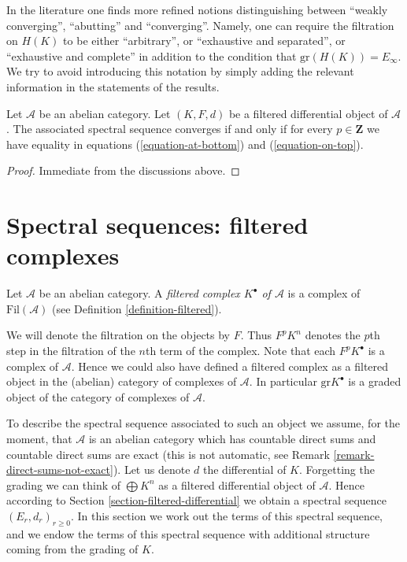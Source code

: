 \noindent
In the literature one finds more refined notions distinguishing between
``weakly converging'', ``abutting'' and ``converging''. Namely, one can
require the filtration on $H(K)$ to be either ``arbitrary'', or
``exhaustive and separated'', or ``exhaustive and complete'' in addition
to the condition that $\text{gr}(H(K)) = E_\infty$. We try to avoid introducing
this notation by simply adding the relevant information in the statements
of the results.

\begin{lemma}
\label{lemma-filtered-differential-ss-converges}
Let $\mathcal{A}$ be an abelian category.
Let $(K, F, d)$ be a filtered differential object of $\mathcal{A}$.
The associated spectral sequence converges if and only if for every
$p \in \mathbf{Z}$ we have equality in equations
(\ref{equation-at-bottom}) and (\ref{equation-on-top}).
\end{lemma}

\begin{proof}
Immediate from the discussions above.
\end{proof}














\section{Spectral sequences: filtered complexes}
\label{section-filtered-complex}

\begin{definition}
\label{definition-filtered-complex}
Let $\mathcal{A}$ be an abelian category.
A {\it filtered complex $K^\bullet$ of $\mathcal{A}$}
is a complex of $\text{Fil}(\mathcal{A})$ (see
Definition \ref{definition-filtered}).
\end{definition}

\noindent
We will denote the filtration on the objects by $F$. Thus
$F^pK^n$ denotes the $p$th step in the filtration of the $n$th term of the
complex. Note that each $F^pK^\bullet$ is a complex of $\mathcal{A}$.
Hence we could also have defined a filtered complex as a filtered object
in the (abelian) category of complexes of $\mathcal{A}$.
In particular $\text{gr} K^\bullet$ is a graded object of the
category of complexes of $\mathcal{A}$.

\medskip\noindent
To describe the spectral sequence associated to such an object
we assume, for the moment, that $\mathcal{A}$ is an abelian category
which has countable direct sums and countable direct sums are exact
(this is not automatic, see Remark \ref{remark-direct-sums-not-exact}).
Let us denote $d$ the differential of $K$. Forgetting the grading
we can think of $\bigoplus K^n$ as a filtered differential object of
$\mathcal{A}$. Hence according to Section \ref{section-filtered-differential}
we obtain a spectral sequence $(E_r, d_r)_{r \geq 0}$. In this section
we work out the terms of this spectral sequence, and we endow the terms
of this spectral sequence with additional structure coming from the
grading of $K$.

